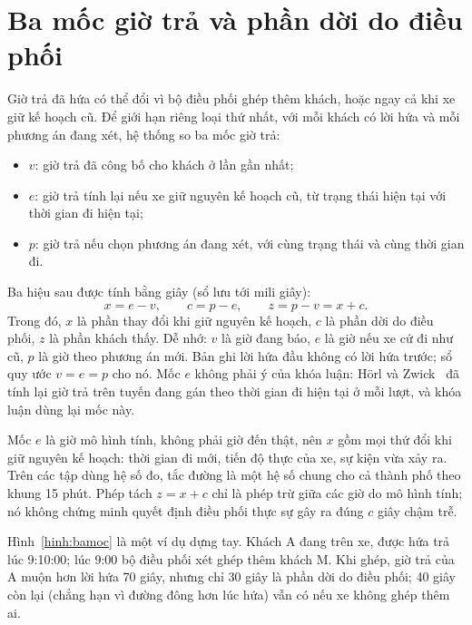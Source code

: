 \section{Ba mốc giờ trả và phần dời do điều phối}
\label{muc:bamoc}

Giờ trả đã hứa có thể đổi vì bộ điều phối ghép thêm khách, hoặc ngay cả khi xe giữ kế hoạch cũ. Để giới hạn
riêng loại thứ nhất, với mỗi khách có lời hứa và mỗi phương án đang xét, hệ thống so ba mốc giờ trả:
\begin{itemize}[leftmargin=1.2cm,itemsep=2pt,topsep=3pt]
\item $v$: giờ trả đã công bố cho khách ở lần gần nhất;
\item $e$: giờ trả tính lại nếu xe giữ nguyên kế hoạch cũ, từ trạng thái hiện tại với thời gian đi hiện tại;
\item $p$: giờ trả nếu chọn phương án đang xét, với cùng trạng thái và cùng thời gian đi.
\end{itemize}
Ba hiệu sau được tính bằng giây (sổ lưu tới mili giây):
\begin{equation}
x = e - v, \qquad c = p - e, \qquad z = p - v = x + c .
\label{eq:bamoc}
\end{equation}
Trong đó, $x$ là phần thay đổi khi giữ nguyên kế hoạch, $c$ là phần dời do điều phối, $z$ là phần khách thấy.
Dễ nhớ: $v$ là giờ đang báo, $e$ là giờ nếu xe cứ đi như cũ, $p$ là giờ theo phương án mới. Bản ghi lời hứa đầu
không có lời hứa trước; sổ quy ước $v = e = p$ cho nó. Mốc $e$ không phải ý của khóa luận: Hörl và
Zwick~\cite{horl2022} đã tính lại giờ trả trên tuyến đang gán theo thời gian đi hiện tại ở mỗi lượt, và khóa
luận dùng lại mốc này.

Mốc $e$ là giờ mô hình tính, không phải giờ đến thật, nên $x$ gồm mọi thứ đổi khi giữ nguyên kế hoạch: thời
gian đi mới, tiến độ thực của xe, sự kiện vừa xảy ra. Trên các tập dùng hệ số đo, tắc đường là một hệ số chung
cho cả thành phố theo khung 15 phút. Phép tách $z = x + c$ chỉ là phép trừ giữa các giờ do mô hình tính; nó
không chứng minh quyết định điều phối thực sự gây ra đúng $c$ giây chậm trễ.

Hình~\ref{hinh:bamoc} là một ví dụ dựng tay. Khách A đang trên xe, được hứa trả lúc 9:10:00; lúc 9:00 bộ điều
phối xét ghép thêm khách M. Khi ghép, giờ trả của A muộn hơn lời hứa 70 giây, nhưng chỉ 30 giây là phần dời do
điều phối; 40 giây còn lại (chẳng hạn vì đường đông hơn lúc hứa) vẫn có nếu xe không ghép thêm ai.

